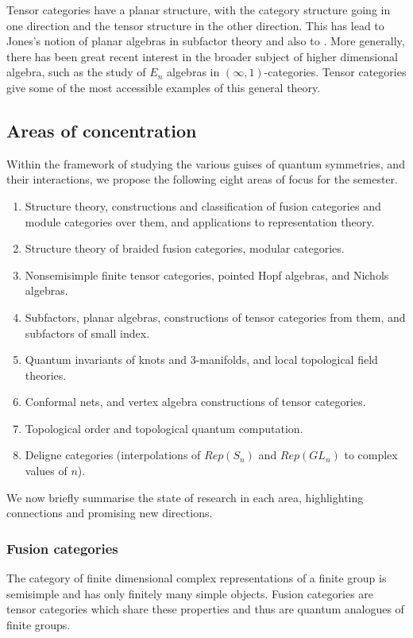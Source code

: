 \documentclass[11pt]{article}
\begin{document}
Tensor categories have a planar structure, with the category structure going in one direction and the tensor structure in the other direction. This has lead to Jones's notion of planar algebras in subfactor theory and also to . More generally, there has been great recent interest in the broader subject of higher dimensional algebra, such as the study of $E_n$ algebras in $(\infty,1)$-categories. Tensor categories give some of the most accessible examples of this general theory.

\subsection{Areas of concentration}
Within the framework of studying the various guises of quantum symmetries, and their interactions,
we propose the following eight areas of focus for the semester.

\begin{enumerate}
  \setlength{\itemsep}{1pt}
  \setlength{\parskip}{0pt}
  \setlength{\parsep}{0pt}
\item Structure theory, constructions and classification of fusion categories and module categories over them, and applications to representation theory.
\item Structure theory of braided fusion categories, modular categories.
\item Nonsemisimple finite tensor categories, pointed Hopf algebras, and Nichols algebras.
\item Subfactors, planar algebras, constructions of tensor categories from them, and subfactors of small index.
\item Quantum invariants of knots and 3-manifolds, and local topological field theories.
\item Conformal nets, and vertex algebra constructions of tensor categories.
\item Topological order and topological quantum computation.
\item Deligne categories (interpolations of $Rep(S_n)$ and $Rep(GL_n)$ to complex values of $n$).
\end{enumerate}

We now briefly summarise the state of research in each area, highlighting connections and promising new directions.

\subsubsection{Fusion categories}
The category of finite dimensional complex representations of a finite group is semisimple and has only finitely many simple objects.  Fusion categories are tensor categories which share these properties and thus are quantum analogues of finite groups.
\end{document}
